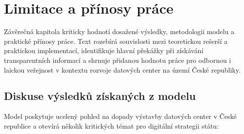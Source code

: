 \chapter{Limitace a přínosy práce}
\label{chap:diskuse_prinosy}

Závěrečná kapitola kriticky hodnotí dosažené výsledky, metodologii modelu a praktické přínosy práce. Text rozebírá souvislosti mezi teoretickou rešerší a praktickou implementací, identifikuje hlavní překážky při získávání transparentních informací a shrnuje přidanou hodnotu práce pro odbornou i laickou veřejnost v kontextu rozvoje datových center na území České republiky.

\section{Diskuse výsledků získaných z modelu}
\label{subsec:diskuse}

Model poskytuje ucelený pohled na dopady výstavby datových center v České republice a otevírá několik kritických témat pro digitální strategii státu:

